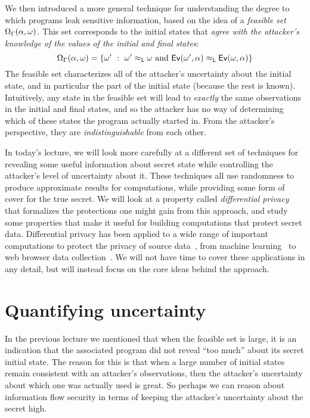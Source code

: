 \documentclass[11pt,twoside]{scrartcl}
\begin{document}
We then introduced a more general technique for understanding the degree to which programs leak sensitive information, based on the idea of a \emph{feasible set} $\Omega_\Gamma(\alpha,\omega)$. This set corresponds to the initial states that \emph{agree with the attacker's knowledge of the \lowsec values of the initial and final states}:
\[
\Omega_\Gamma(\alpha,\omega) =
\{
 \omega' ~\mathrel{\mathop{:}}~ \omega' \approx_{\texttt{\upshape L}} \omega~\text{and}~\mathsf{Ev}(\omega',\alpha) \approx_{\texttt{\upshape L}} \mathsf{Ev}(\omega,\alpha)
\}
\]
The feasible set characterizes all of the attacker's uncertainty about the initial state, and in particular the \hisec part of the initial state (because the rest is known). Intuitively, any state in the feasible set will lead to \emph{exactly} the same observations in the initial and final states, and so the attacker has no way of determining which of these states the program actually started in. From the attacker's perspective, they are \emph{indistinguishable} from each other.

In today's lecture, we will look more carefully at a different set of techniques for revealing some useful information about secret state while controlling the attacker's level of uncertainty about it. These techniques all use randomness to produce approximate results for computations, while providing some form of cover for the true secret. We will look at a property called \emph{differential privacy}~\cite{dwork06} that formalizes the protections one might gain from this approach, and study some properties that make it useful for building computations that protect secret data. Differential privacy has been applied to a wide range of important computations to protect the privacy of source data~\cite{Dwork2014}, from machine learning~\cite{Chaudhuri2011} to web browser data collection~\cite{ErlingssonKP14}. We will not have time to cover these applications in any detail, but will instead focus on the core ideas behind the approach.

\section{Quantifying uncertainty}

In the previous lecture we mentioned that when the feasible set is large, it is an indication that the associated program did not reveal ``too much'' about its secret initial state. The reason for this is that when a large number of initial states remain consistent with an attacker's observations, then the attacker's uncertainty about which one was actually used is great. So perhaps we can reason about information flow security in terms of keeping the attacker's uncertainty about the secret high.
\end{document}
